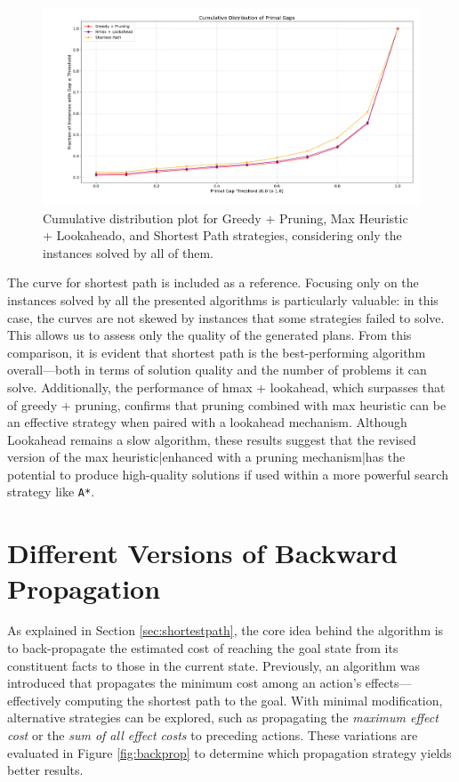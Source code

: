 \begin{figure}[h!]
	\centering
	\includegraphics[width=\textwidth]{images/algs234_solved_all.png}
	\caption{Cumulative distribution plot for Greedy + Pruning, Max Heuristic + Lookaheado, and Shortest Path strategies,
		considering only the instances solved by all of them.}
	\label{fig:algs234_solved_all}
\end{figure}

The curve for shortest path is included as a reference. Focusing only on the instances solved by all the presented algorithms
is particularly valuable: in this case, the curves are not skewed by instances that some strategies failed to solve.
This allows us to assess only the quality of the generated plans. From this comparison, it is evident that shortest path
is the best-performing algorithm overall—both in terms of solution quality and the number of problems it can solve.
Additionally, the performance of hmax + lookahead, which surpasses that of greedy + pruning, confirms that pruning combined
with max heuristic can be an effective strategy when paired with a lookahead mechanism.
Although Lookahead remains a slow algorithm, these results suggest that the revised version of the max heuristic|enhanced
with a pruning mechanism|has the potential to produce high-quality solutions if used within a more powerful search strategy
like \verb|A*|.

\section{Different Versions of Backward Propagation}
As explained in Section \ref{sec:shortestpath}, the core idea behind the algorithm is to back-propagate the estimated cost
of reaching the goal state from its constituent facts to those in the current state. Previously, an algorithm was introduced
that propagates the minimum cost among an action's effects—effectively computing the shortest path to the goal.
With minimal modification, alternative strategies can be explored, such as propagating the \textit{maximum effect cost} or the
\textit{sum of all effect costs} to preceding actions. These variations are evaluated in Figure \ref{fig:backprop} to determine which
propagation strategy yields better results.

